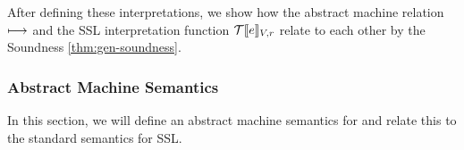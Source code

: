 After defining these interpretations, we show how the abstract machine relation $\longmapsto$ and the SSL interpretation function $\mathcal{T}\llbracket e\rrbracket_{V,r}$ relate to each other by the Soundness \autoref{thm:gen-soundness}.

%
%
%


\subsubsection{Abstract Machine Semantics}
In this section, we will define an abstract machine semantics for \tool and relate this to
the standard semantics for SSL.


